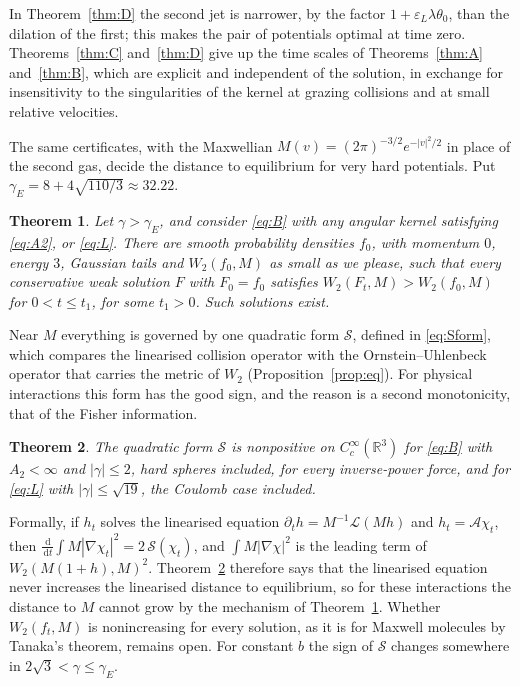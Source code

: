 \documentclass[11pt]{amsart}
\newtheorem{mainthm}{Theorem}
\theoremstyle{definition}
\newcommand{\RR}{\mathbb{R}}
\newcommand{\dd}{\,\mathrm{d}}
\begin{document}
In Theorem~\ref{thm:D} the second jet is narrower, by the factor $1+\varepsilon_L\lambda\theta_0$, than the dilation of the first; this makes the pair of potentials optimal at time zero. Theorems~\ref{thm:C} and~\ref{thm:D} give up the time scales of Theorems~\ref{thm:A} and~\ref{thm:B}, which are explicit and independent of the solution, in exchange for insensitivity to the singularities of the kernel at grazing collisions and at small relative velocities.

The same certificates, with the Maxwellian $M(v)=(2\pi)^{-3/2}e^{-|v|^2/2}$ in place of the second gas, decide the distance to equilibrium for very hard potentials. Put $\gamma_E=8+4\sqrt{110/3}\approx32.22$.

\begin{mainthm}\label{thm:E}
Let $\gamma>\gamma_E$, and consider \eqref{eq:B} with any angular kernel satisfying \eqref{eq:A2}, or \eqref{eq:L}. There are smooth probability densities $f_0$, with momentum $0$, energy $3$, Gaussian tails and $W_2(f_0,M)$ as small as we please, such that every conservative weak solution $F$ with $F_0=f_0$ satisfies $W_2(F_t,M)>W_2(f_0,M)$ for $0<t\le t_1$, for some $t_1>0$. Such solutions exist.
\end{mainthm}

Near $M$ everything is governed by one quadratic form $\mathcal S$, defined in \eqref{eq:Sform}, which compares the linearised collision operator with the Ornstein--Uhlenbeck operator that carries the metric of $W_2$ (Proposition~\ref{prop:eq}). For physical interactions this form has the good sign, and the reason is a second monotonicity, that of the Fisher information.

\begin{mainthm}\label{thm:F}
The quadratic form $\mathcal S$ is nonpositive on $C^\infty_c(\RR^3)$ for \eqref{eq:B} with $A_2<\infty$ and $|\gamma|\le2$, hard spheres included, for every inverse-power force, and for \eqref{eq:L} with $|\gamma|\le\sqrt{19}$, the Coulomb case included.
\end{mainthm}

Formally, if $h_t$ solves the linearised equation $\partial_th=M^{-1}\mathcal L(Mh)$ and $h_t=\mathcal A\chi_t$, then $\frac{\dd}{\dd t}\int M|\nabla\chi_t|^2=2\,\mathcal S(\chi_t)$, and $\int M|\nabla\chi|^2$ is the leading term of $W_2(M(1+h),M)^2$. Theorem~\ref{thm:F} therefore says that the linearised equation never increases the linearised distance to equilibrium, so for these interactions the distance to $M$ cannot grow by the mechanism of Theorem~\ref{thm:E}. Whether $W_2(f_t,M)$ is nonincreasing for every solution, as it is for Maxwell molecules by Tanaka's theorem, remains open. For constant $b$ the sign of $\mathcal S$ changes somewhere in $2\sqrt3<\gamma\le\gamma_E$.
\end{document}

